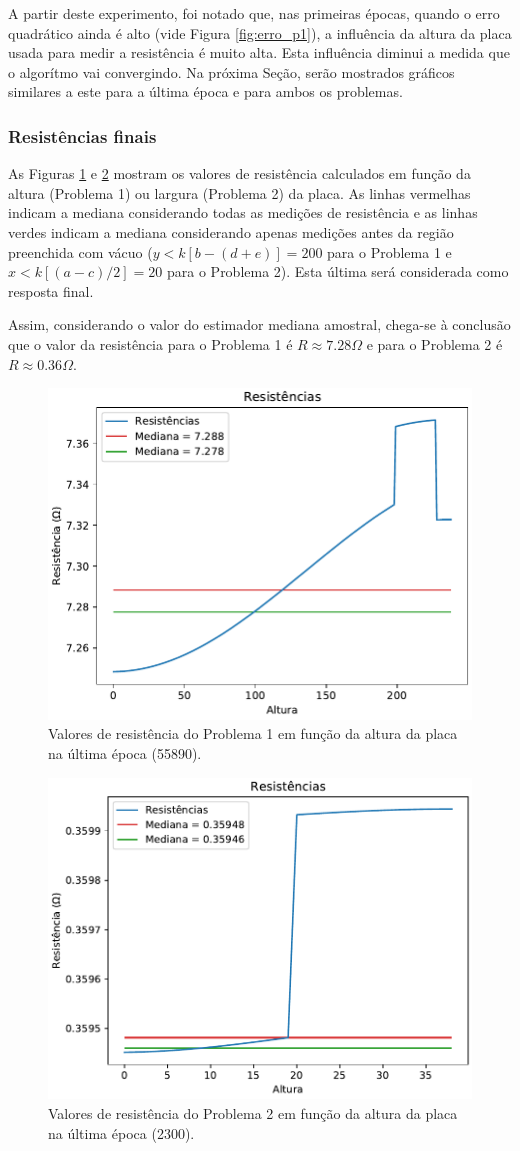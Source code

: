 \documentclass{aleph-revista}
\begin{document}
A partir deste experimento, foi notado que, nas primeiras épocas, quando o erro quadrático ainda é alto (vide Figura \ref{fig:erro_p1}), a influência da altura da placa usada para medir a resistência é muito alta. Esta influência diminui a medida que o algorítmo vai convergindo. Na próxima Seção, serão mostrados gráficos similares a este para a última época e para ambos os problemas.


\newpage
\subsubsection{Resistências finais}

As Figuras \ref{fig:res_p1} e \ref{fig:res_p2} mostram os valores de resistência calculados em função da altura (Problema 1) ou largura (Problema 2) da placa. As linhas vermelhas indicam a mediana considerando todas as medições de resistência e as linhas verdes indicam a mediana considerando apenas medições antes da região preenchida com vácuo ($y < k[b-(d+e)] = 200$ para o Problema 1 e $x < k[(a-c)/2] = 20$ para o Problema 2). Esta última será considerada como resposta final.

Assim, considerando o valor do estimador mediana amostral, chega-se à conclusão que o valor da resistência para o Problema 1 é $R \approx 7.28 \Omega$ e para o Problema 2 é $R \approx 0.36 \Omega$.

\begin{figure}[!ht]
  \centering
  \includegraphics[width=0.7\linewidth]{p1_resistencias}
  \caption{Valores de resistência do Problema 1 em função da altura da placa na última época (55890).}
  \label{fig:res_p1}
\end{figure}

\begin{figure}[!ht]
  \centering
  \includegraphics[width=0.7\linewidth]{p2_resistencias}
  \caption{Valores de resistência do Problema 2 em função da altura da placa na última época (2300).}
  \label{fig:res_p2}
\end{figure}


\end{document}
